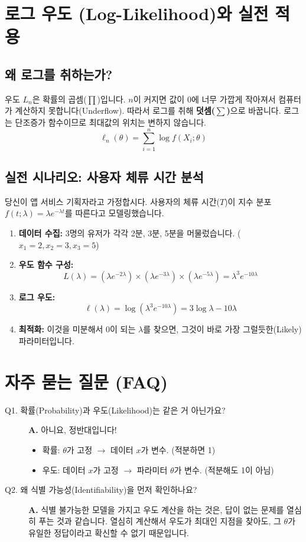 \documentclass[11pt,a4paper]{book}
\theoremstyle{definition}
\begin{document}
\section{로그 우도 (Log-Likelihood)와 실전 적용}

\subsection*{왜 로그를 취하는가?}
우도 $L_n$은 확률의 곱셈($\prod$)입니다. $n$이 커지면 값이 0에 너무 가깝게 작아져서 컴퓨터가 계산하지 못합니다(Underflow).
따라서 로그를 취해 \textbf{덧셈($\sum$)}으로 바꿉니다. 로그는 단조증가 함수이므로 최대값의 위치는 변하지 않습니다.
$$ \ell_n(\theta) = \sum_{i=1}^n \log f(X_i; \theta) $$

\subsection*{실전 시나리오: 사용자 체류 시간 분석}
당신이 앱 서비스 기획자라고 가정합시다. 사용자의 체류 시간($T$)이 지수 분포 $f(t;\lambda) = \lambda e^{-\lambda t}$를 따른다고 모델링했습니다.
\begin{enumerate}
    \item \textbf{데이터 수집:} 3명의 유저가 각각 2분, 3분, 5분을 머물렀습니다. ($x_1=2, x_2=3, x_3=5$)
    \item \textbf{우도 함수 구성:}
    $$ L(\lambda) = (\lambda e^{-2\lambda}) \times (\lambda e^{-3\lambda}) \times (\lambda e^{-5\lambda}) = \lambda^3 e^{-10\lambda} $$
    \item \textbf{로그 우도:}
    $$ \ell(\lambda) = \log(\lambda^3 e^{-10\lambda}) = 3\log\lambda - 10\lambda $$
    \item \textbf{최적화:} 이것을 미분해서 0이 되는 $\lambda$를 찾으면, 그것이 바로 가장 그럴듯한(Likely) 파라미터입니다.
\end{enumerate}

\section{자주 묻는 질문 (FAQ)}

\begin{description}
    \item[Q1. 확률(Probability)과 우도(Likelihood)는 같은 거 아닌가요?]
    \textbf{A.} 아니요, 정반대입니다! 
    \begin{itemize}
        \item 확률: $\theta$가 고정 $\rightarrow$ 데이터 $x$가 변수. (적분하면 1)
        \item 우도: 데이터 $x$가 고정 $\rightarrow$ 파라미터 $\theta$가 변수. (적분해도 1이 아님)
    \end{itemize}
    
    \item[Q2. 왜 식별 가능성(Identifiability)을 먼저 확인하나요?]
    \textbf{A.} 식별 불가능한 모델을 가지고 우도 계산을 하는 것은, 답이 없는 문제를 열심히 푸는 것과 같습니다. 열심히 계산해서 우도가 최대인 지점을 찾아도, 그 $\theta$가 유일한 정답이라고 확신할 수 없기 때문입니다.
\end{description}
\end{document}
